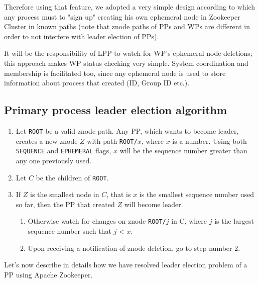\documentclass[sigchi]{acmart}
\begin{document}
Therefore using that feature, we adopted a very simple design according to which any process must to "sign up" creating his own ephemeral node in Zookeeper Cluster in known paths (note that znode paths of PPs and WPs are different in order to not interfere with leader election of PPs). 

It will be the responsibility of LPP to watch for WP's ephemeral node deletions; this approach makes WP status checking very simple. System coordination and membership is facilitated too, since any ephemeral node is used to store information about process that created (ID, Group ID etc.).


\subsection{Primary process leader election algorithm}

\begin{algorithm}
\caption{}\label{alg:leaderElection}
\begin{enumerate}

\item Let \texttt{ROOT} be a valid znode path. Any PP, which wants to become leader, creates a new znode $Z$ with path \texttt{ROOT/$x$}, where $x$ is a number. Using both \texttt{SEQUENCE} and \texttt{EPHEMERAL} flags, $x$ will be the sequence number greater than any one previously used.

\item Let $C$ be the children of \texttt{ROOT}. 

\item If $Z$ is the smallest node in $C$, that is $x$ is the smallest sequence number used so far, then the PP that created $Z$ will become leader.

\begin{enumerate}

\item Otherwise watch for changes on znode \texttt{ROOT/$j$} in C, where $j$ is the largest sequence number such that $j$ < $x$.

\item Upon receiving a notification of znode deletion, go to step number 2. 

\end{enumerate}
\end{enumerate}
\end{algorithm}

Let's now describe in details how we have resolved leader election problem of a PP using Apache Zookeeper.
\end{document}

